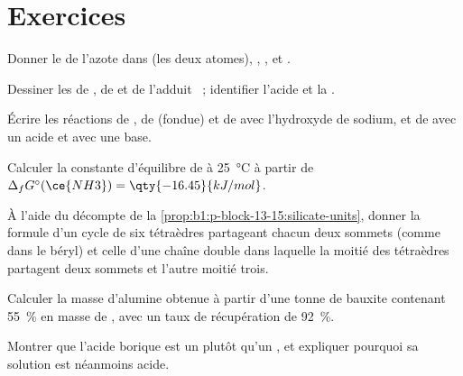 \section{Exercices}

\begin{exercise}[$\star$]\label{exo:b1:p-block-13-15:1}
Donner le  de l'azote dans  (les deux
atomes),
, ,  et .
\end{exercise}

\begin{exercise}[$\star$]\label{exo:b1:p-block-13-15:2}
Dessiner les  de , de  et de l'adduit
~; identifier l'acide et la .
\end{exercise}

\begin{exercise}[$\star$]\label{exo:b1:p-block-13-15:3}
Écrire les réactions de , de  (fondue) et de
 avec l'hydroxyde de sodium, et de  avec un acide et
avec une base.
\end{exercise}

\begin{exercise}[$\star$]\label{exo:b1:p-block-13-15:4}
Calculer la constante d'équilibre de  à
\qty{25}{\celsius} à partir de $\Delta_f G^\circ(\ce{NH3}) =
\qty{-16.45}{kJ/mol}$.
\end{exercise}

\begin{exercise}[$\star\star$]\label{exo:b1:p-block-13-15:5}
À l'aide du décompte de la \cref{prop:b1:p-block-13-15:silicate-units},
donner la formule d'un cycle de six tétraèdres partageant chacun deux
sommets (comme dans le béryl) et celle d'une chaîne double dans laquelle
la moitié des tétraèdres partagent deux sommets et l'autre moitié trois.
\end{exercise}

\begin{exercise}[$\star\star$]\label{exo:b1:p-block-13-15:6}
Calculer la masse d'alumine obtenue à partir d'une tonne de bauxite
contenant \qty{55}{\percent} en masse de , avec un taux de
récupération de \qty{92}{\percent}.
\end{exercise}

\begin{exercise}[$\star\star$]\label{exo:b1:p-block-13-15:7}
Montrer que l'acide borique est un  plutôt qu'un , et expliquer pourquoi sa solution est néanmoins acide.
\end{exercise}

